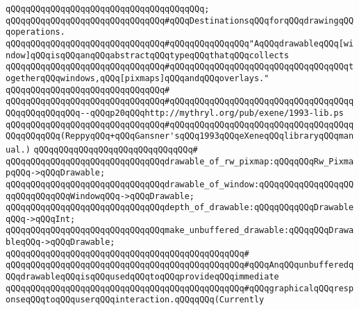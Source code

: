 \verb|qQQqqQQqqQQqqQQqqQQqqQQqqQQqqQQqqQQqqQQq;|\newline
\newline
\newline
\verb|qQQqqQQqqQQqqQQqqQQqqQQqqQQqqQQq#qQQqDestinationsqQQqforqQQqdrawingqQQqoperations.|\newline
\newline
\verb|qQQqqQQqqQQqqQQqqQQqqQQqqQQqqQQq#qQQqqQQqqQQqqQQq"AqQQqdrawableqQQq[window]qQQqisqQQqanqQQqabstractqQQqtypeqQQqthatqQQqcollects|\newline
\verb|qQQqqQQqqQQqqQQqqQQqqQQqqQQqqQQq#qQQqqQQqqQQqqQQqqQQqqQQqqQQqqQQqqQQqtogetherqQQqwindows,qQQq[pixmaps]qQQqandqQQqoverlays."|\newline
\verb|qQQqqQQqqQQqqQQqqQQqqQQqqQQqqQQq#|\newline
\verb|qQQqqQQqqQQqqQQqqQQqqQQqqQQqqQQq#qQQqqQQqqQQqqQQqqQQqqQQqqQQqqQQqqQQqqQQqqQQqqQQqqQQq--qQQqp20qQQqhttp://mythryl.org/pub/exene/1993-lib.ps|\newline
\verb|qQQqqQQqqQQqqQQqqQQqqQQqqQQqqQQq#qQQqqQQqqQQqqQQqqQQqqQQqqQQqqQQqqQQqqQQqqQQqqQQq(ReppyqQQq+qQQqGansner'sqQQq1993qQQqeXeneqQQqlibraryqQQqmanual.)|\newline
\verb|qQQqqQQqqQQqqQQqqQQqqQQqqQQqqQQq#|\newline
\newline
\verb|qQQqqQQqqQQqqQQqqQQqqQQqqQQqqQQqdrawable_of_rw_pixmap:qQQqqQQqRw_PixmapqQQq->qQQqDrawable;|\newline
\verb|qQQqqQQqqQQqqQQqqQQqqQQqqQQqqQQqdrawable_of_window:qQQqqQQqqQQqqQQqqQQqqQQqqQQqqQQqWindowqQQq->qQQqDrawable;|\newline
\newline
\verb|qQQqqQQqqQQqqQQqqQQqqQQqqQQqqQQqdepth_of_drawable:qQQqqQQqqQQqDrawableqQQq->qQQqInt;|\newline
\newline
\newline
\newline
\verb|qQQqqQQqqQQqqQQqqQQqqQQqqQQqqQQqmake_unbuffered_drawable:qQQqqQQqDrawableqQQq->qQQqDrawable;|\newline
\verb|qQQqqQQqqQQqqQQqqQQqqQQqqQQqqQQqqQQqqQQqqQQqqQQq#|\newline
\verb|qQQqqQQqqQQqqQQqqQQqqQQqqQQqqQQqqQQqqQQqqQQqqQQq#qQQqAnqQQqunbufferedqQQqdrawableqQQqisqQQqusedqQQqtoqQQqprovideqQQqimmediate|\newline
\verb|qQQqqQQqqQQqqQQqqQQqqQQqqQQqqQQqqQQqqQQqqQQqqQQq#qQQqgraphicalqQQqresponseqQQqtoqQQquserqQQqinteraction.qQQqqQQq(Currently|\newline
